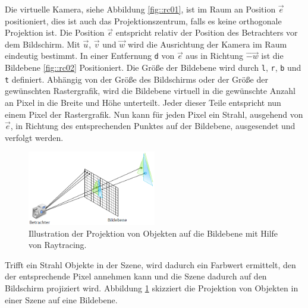 Die virtuelle Kamera, siehe Abbildung \ref{fig::rc01}, ist im Raum an Position $\vec{e}$ positioniert, dies ist auch das Projektionszentrum, falls es keine orthogonale Projektion ist.
Die Position $\vec{e}$ entspricht relativ der Position des Betrachters vor dem Bildschirm.
Mit $\vec{u}$, $\vec{v}$ und $\vec{w}$ wird die Ausrichtung der Kamera im Raum eindeutig bestimmt.
In einer Entfernung \texttt{d} von $\vec{e}$ aus in Richtung $\vec{-w}$ ist die Bildebene \ref{fig::rc02} Positioniert.
Die Größe der Bildebene wird durch \texttt{l}, \texttt{r}, \texttt{b} und \texttt{t} definiert.
Abhängig von der Größe des Bildschirms oder der Größe der gewünschten Rastergrafik, wird die Bildebene virtuell in die gewünschte Anzahl an Pixel in die Breite und Höhe unterteilt.
Jeder dieser Teile entspricht nun einem Pixel der Rastergrafik.
Nun kann für jeden Pixel ein Strahl, ausgehend von $\vec{e}$, in Richtung des entsprechenden Punktes auf der Bildebene, ausgesendet und verfolgt werden.
\begin{figure}
	\centering
	\includegraphics[width=0.5\textwidth]{../../Grafiken/Raytracing.png}
	\caption{Illustration der Projektion von Objekten auf die Bildebene mit Hilfe von Raytracing. \cite{Dr.MichaelKrone2016/2017}}
	\label{fig::rc03}
\end{figure}
Trifft ein Strahl Objekte in der Szene, wird dadurch ein Farbwert ermittelt, den der entsprechende Pixel annehmen kann und die Szene dadurch auf den Bildschirm projiziert wird.
Abbildung \ref{fig::rc03} skizziert die Projektion von Objekten in einer Szene auf eine Bildebene.

